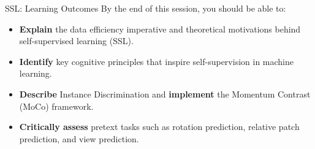 \begin{frame}{SSL: Learning Outcomes}
    By the end of this session, you should be able to:
    \begin{itemize}
        \item \textbf{Explain} the data efficiency imperative and theoretical motivations behind self-supervised learning (SSL).
        \item \textbf{Identify} key cognitive principles that inspire self-supervision in machine learning.
        \item \textbf{Describe} Instance Discrimination and \textbf{implement} the Momentum Contrast (MoCo) framework.
        \item \textbf{Critically assess} pretext tasks such as rotation prediction, relative patch prediction, and view prediction.
    \end{itemize}
\end{frame}
